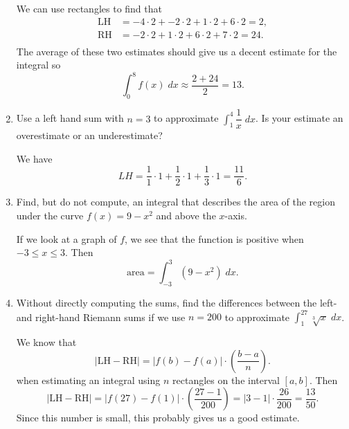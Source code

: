 \documentclass[11pt]{article}
\newcommand{\ds}{\displaystyle}
\begin{document}
\begin{enumerate}
{    We can use rectangles to find that
    \begin{align*}
      \text{LH} &= -4\cdot 2 + -2\cdot 2 + 1\cdot 2 + 6\cdot 2 = 2,\\
      \text{RH} &= -2\cdot 2 + 1\cdot 2 + 6\cdot 2 + 7\cdot 2 = 24.\\
    \end{align*}
    The average of these two estimates should give us a decent
    estimate for the integral so
    \[
    \int_0^8 f(x)\; dx \approx \frac{2+24}{2} = 13.
    \]

  }
  \vfill
  \newpage

\item Use a left hand sum with $n=3$ to approximate
  $\ds\int_1^4\dfrac{1}{x}\;dx$.  Is your estimate an overestimate or
  an underestimate?

  \vfill
  {\color{blue}

    We have
    \[
    LH = \frac{1}{1}\cdot 1 + \frac{1}{2}\cdot 1 + \frac{1}{3}\cdot 1
    = \frac{11}{6}.
    \]

  }
  \vfill

\item Find, but do not compute, an integral that describes the area of
  the region under the curve $f(x)=9-x^2$ and above the $x$-axis.

  \vfill
  {\color{blue}

    If we look at a graph of $f$, we see that the function is positive
    when $-3\leq x\leq 3$. Then
    \[
    \text{area} = \int_{-3}^3 (9-x^2)\; dx.
    \]

  }
  \vfill

  \newpage

\item Without directly computing the sums, find the differences between
  the left- and right-hand Riemann sums if we use $n=200$ to
  approximate $\ds\int_1^{27}\sqrt[3]{x}\;dx$.

  \vfill
  {\color{blue}

    We know that
    \[
    \left|\text{LH} - \text{RH}\right| = \left|f(b) - f(a)\right|
    \cdot \left(\frac{b-a}{n}\right).
    \]
    when estimating an integral using $n$ rectangles on the interval
    $[a,b]$. Then 
    \[
    \left|\text{LH} - \text{RH}\right| = \left|f(27) - f(1)\right|
    \cdot \left(\frac{27-1}{200}\right) = |3 - 1|\cdot\frac{26}{200} =
    \frac{13}{50}.
    \]
    Since this number is small, this probably gives us a good
    estimate.

  }
  \vfill


\end{enumerate}
\end{document}
